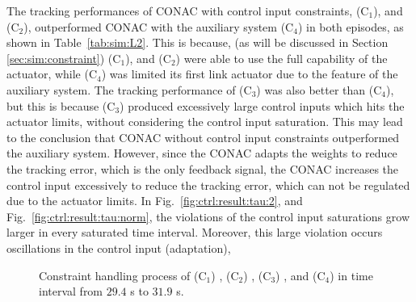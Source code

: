 \documentclass[lettersize,journal]{IEEEtran}
\begin{document}
The tracking performances of CONAC with control input constraints, \ie (C$_1$), and (C$_2$), outperformed CONAC with the auxiliary system (C$_4$) in both episodes, as shown in Table~\ref{tab:sim:L2}.
This is because, (as will be discussed in Section \ref{sec:sim:constraint}) (C$_1$), and (C$_2$) were able to use the full capability of the actuator, while (C$_4$) was limited its first link actuator due to the feature of the auxiliary system.
The tracking performance of (C$_3$) was also better than (C$_4$), but this is because (C$_3$) produced excessively large control inputs which hits the actuator limits, without considering the control input saturation.
This may lead to the conclusion that CONAC without control input constraints outperformed the auxiliary system.
However, since the CONAC adapts the weights to reduce the tracking error, \ie which is the only feedback signal, the CONAC increases the control input excessively to reduce the tracking error, which can not be regulated due to the actuator limits.
In Fig.~\ref{fig:ctrl:result:tau:2}, and Fig.~\ref{fig:ctrl:result:tau:norm}, the violations of the control input saturations grow larger in every saturated time interval.
Moreover, this large violation occurs oscillations in the control input (adaptation), 



\begin{figure}[t]
    \centering
    \subfloat[Control input $\tau$ in time interval from $29.4$ s to $31.9$ s (bird's eye view).]{
        \texttt{[image: 
            src/measurement/figures/compare/Fig6.eps
        ]}%
        \label{fig:ctrl:result:scope:control}}
        \vfill
        \vfill
  \caption{
    Constraint handling process of (C$_1$) \protect{}, (C$_2$) \protect{}, (C$_3$) \protect{}, and (C$_4$) \protect{} in time interval from $29.4$ s to $31.9$ s.
  }
\label{fig:ctrl:result:scope}
\end{figure}
\end{document}
